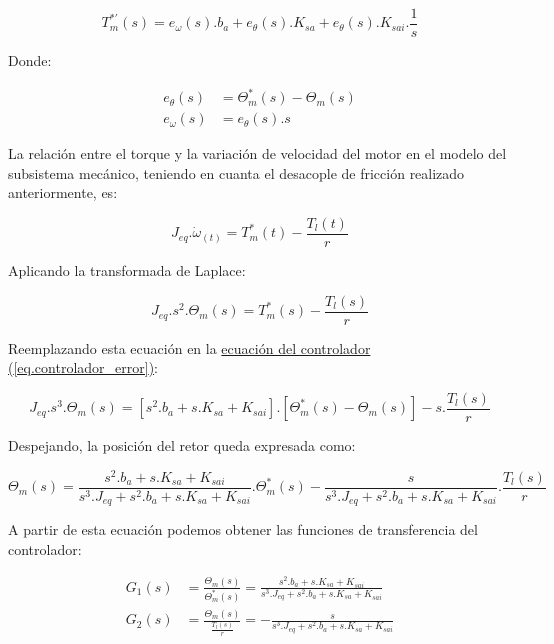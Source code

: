 \documentclass{article}
\begin{document}
\begin{equation}\label{eq.controlador_error}
    T_m^{*\prime}(s) = e_\omega(s).b_a + e_\theta(s).K_{sa} + e_\theta(s).K_{sai}.\frac{1}{s}
\end{equation}

Donde:

\begin{align}
    e_\theta(s) &= \Theta_m^*(s) - \Theta_m(s) \\
    e_\omega(s) &= e_\theta(s).s
\end{align}

La relación entre el torque y la variación de velocidad del motor en el modelo del subsistema mecánico, 
teniendo en cuanta el desacople de fricción realizado anteriormente, es:

\begin{equation}
    J_{eq}.\dot{\omega}_(t) = T_m^*(t) - \frac{T_l(t)}{r}
\end{equation}

Aplicando la transformada de Laplace:

\begin{equation}
    J_{eq}.s^2.\Theta_m(s) = T_m^*(s) - \frac{T_l(s)}{r}
\end{equation}

Reemplazando esta ecuación en la
\hyperref[eq.controlador_error]{ecuación del controlador (\ref*{eq.controlador_error})}:

\begin{equation}
    J_{eq}.s^3.\Theta_m(s) = [s^2.b_a + s.K_{sa} + K_{sai}].[\Theta_m^*(s) - \Theta_m(s)] - s.\frac{T_l(s)}{r}
\end{equation}

Despejando, la posición del retor queda expresada como:

\begin{equation}
    \Theta_m(s) = \frac{s^2.b_a + s.K_{sa} + K_{sai}}{s^3.J_{eq} + s^2.b_a + s.K_{sa} + K_{sai}}.\Theta_m^*(s) - \frac{s}{s^3.J_{eq} + s^2.b_a + s.K_{sa} + K_{sai}}.\frac{T_l(s)}{r}
\end{equation}

A partir de esta ecuación podemos obtener las funciones de transferencia del controlador:

\begin{align}
    G_1(s) &= \frac{\Theta_m(s)}{\Theta_m^*(s)} = \frac{s^2.b_a + s.K_{sa} + K_{sai}}{s^3.J_{eq} + s^2.b_a + s.K_{sa} + K_{sai}} \\
    G_2(s) &= \frac{\Theta_m(s)}{\frac{T_l(s)}{r}} = -\frac{s}{s^3.J_{eq} + s^2.b_a + s.K_{sa} + K_{sai}}
\end{align}
\end{document}
